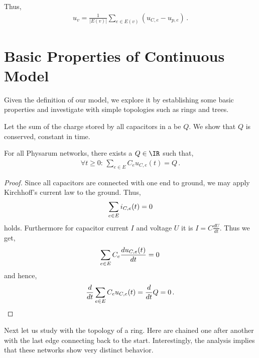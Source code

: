 Thus,
\begin{align}
  u_v = \frac{1}{|E(v)|}\sum_{e \in E(v)}(u_{C,e}-u_{p,e})\,.\label{eq:uv}
\end{align}


\section{Basic Properties of Continuous Model}\label{sec:basic_cont}

  Given the definition of our model, we explore it by establishing some basic properties and investigate \Pns with simple topologies such as rings and trees.

  Let the sum of the charge stored by all capacitors in a \Pn be $Q$. We show that $Q$ is conserved, \ie constant in time.

\begin{lem}\label{lem:inv_cont}
For all Physarum networks, there exists a $Q \in \IR$ such that,
\begin{align}
\forall t\ge 0:\,\sum_{e \in E}C_e u_{C,e}(t) = Q\,.
\end{align}
\end{lem}
\begin{proof}
Since all capacitors are connected with one end to ground, we may apply Kirchhoff's current law to the ground.
Thus,  
\begin{align}
\sum_{e \in E}i_{C,e}(t) = 0\notag
\end{align}
holds. Furthermore for capacitor current $I$ and voltage $U$ it is $I= C \frac{dU}{dt}$. Thus we get,
\begin{align}
\sum_{e \in E}C_e\frac{du_{C,e}(t)}{dt} = 0\,\notag
\end{align}
and hence,
\begin{align}
\frac{d}{dt}\sum_{e \in E}C_eu_{C,e}(t) = \frac{d}{dt} Q = 0\,.\notag
\end{align}
\end{proof}

Next let us study \Pns with the topology of a ring. Here \Pes are chained one after another with the last edge connecting back to the start. Interestingly, the analysis implies that these networks show very distinct behavior. 

